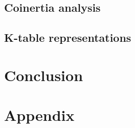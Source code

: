 \documentclass[a4paper,10pt]{article}
\begin{document}
\subsection{Coinertia analysis}




\subsection{K-table representations}






\section{Conclusion}





\section{Appendix}
\end{document}
